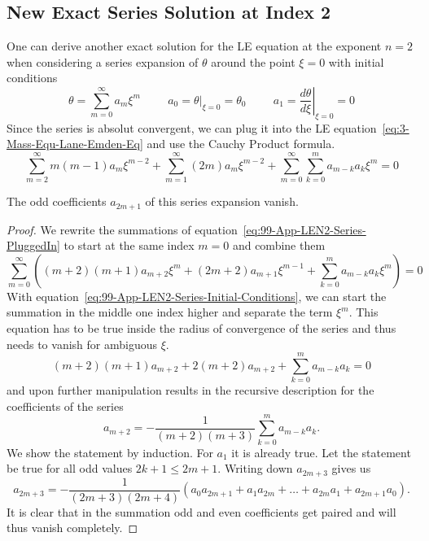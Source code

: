 \subsection{New Exact \texorpdfstring{}{LE} Series Solution at Index 2}
\label{subsec:99-app-new-exact-le-sol-n2}
One can derive another exact solution for the \ac{LE} equation at the exponent $n=2$ when
considering a series expansion of $\theta$ around the point $\xi=0$ with initial conditions
\begin{equation}
	\theta=\sum\limits_{m=0}^\infty a_m\xi^m \hspace{1cm} a_0=\left.\theta\right|_{\xi=0}=\theta_0
	\hspace{1cm} a_1=\left.\frac{d\theta}{d\xi}\right|_{\xi=0}=0
	\label{eq:99-App-LEN2-Series-Initial-Conditions}
\end{equation}
Since the series is absolut convergent, we can plug it into the \ac{LE} equation~\ref{eq:3-Mass-Equ-Lane-Emden-Eq} and use the Cauchy Product formula.
\begin{equation}
	\sum\limits_{m=2}^\infty m(m-1)a_m\xi^{m-2}+\sum\limits_{m=1}^\infty (2m)a_m\xi^{m-2} +
	\sum\limits_{m=0}^\infty\sum\limits_{k=0}^m a_{m-k}a_k\xi^m = 0
	\label{eq:99-App-LEN2-Series-PluggedIn}
\end{equation}
\begin{theorem}
	The odd coefficients $a_{2m+1}$ of this series expansion vanish.
\end{theorem}
\begin{proof}
	We rewrite the summations of equation~\ref{eq:99-App-LEN2-Series-PluggedIn} to start at the
	same index $m=0$ and combine them
	\begin{equation}
		\sum\limits_{m=0}^\infty\left((m+2)(m+1)a_{m+2}\xi^{m}+(2m+2)a_{m+1}\xi^{m-1} + \sum\limits_{k=0}^m a_{m-k}a_k\xi^m\right) = 0
		\label{eq:99-App-LE-New-Recursive-1}
	\end{equation}
	With equation~\ref{eq:99-App-LEN2-Series-Initial-Conditions}, we can start the summation
	in the middle one index higher and separate the term $\xi^m$.
	This equation has to be true
	inside the radius of convergence of the series and thus needs to vanish for ambiguous $\xi$.
	\begin{equation}
		(m+2)(m+1)a_{m+2}+2(m+2)a_{m+2}+\sum\limits_{k=0}^m a_{m-k}a_k = 0
		\label{eq:99-App-LE-New-Recursive-2}
	\end{equation}
	and upon further manipulation results in the recursive description for the coefficients
	of the series
	\begin{equation}
		a_{m+2} = -\frac{1}{(m+2)(m+3)}\sum\limits_{k=0}^m a_{m-k}a_k.
		\label{eq:99-App-LEN2-Recursive-Coefficients}
	\end{equation}
	We show the statement by induction.
	For $a_1$ it is already true.
	Let the statement be true for all odd values $2k+1\leq2m+1$.
	Writing down $a_{2m+3}$ gives us
	\begin{equation}
		a_{2m+3} = -\frac{1}{(2m+3)(2m+4)}\left(a_0 a_{2m+1}+a_1 a_{2m}+\dots+a_{2m}a_1+a_{2m+1}a_0\right).
		\label{eq:99-App-LE-New-Recursive-3}
	\end{equation}
	It is clear that in the summation odd and even coefficients get paired and will thus
	vanish completely.
\end{proof}
